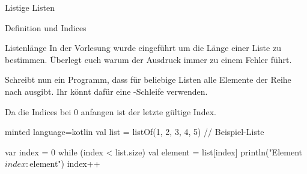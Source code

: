 \begin{task}[points=auto]{Listige Listen}
\begin{subtask*}[points=0]{Definition und Indices }
\begin{solution}
        \end{solution}
    \end{subtask*}
    \begin{subtask*}[points=0]{Listenlänge }
        In der Vorlesung wurde  eingeführt um die Länge einer
        Liste zu bestimmen. Überlegt euch warum der Ausdruck 
        immer zu einem Fehler führt.

        Schreibt nun ein Programm, dass für beliebige Listen alle Elemente der Reihe
        nach ausgibt. Ihr könnt dafür eine -Schleife verwenden.

        \begin{solution}
            Da die Indices bei 0 anfangen ist  der letzte gültige Index.

            \begin{codeBlock}[]{minted language=kotlin}
                val list = listOf(1, 2, 3, 4, 5) // Beispiel-Liste

                var index = 0
                while (index < list.size) {
                    val element = list[index]
                    println("Element $index: $element")
                    index++
                }
            \end{codeBlock}
        \end{solution}
    \end{subtask*}
\end{task}
